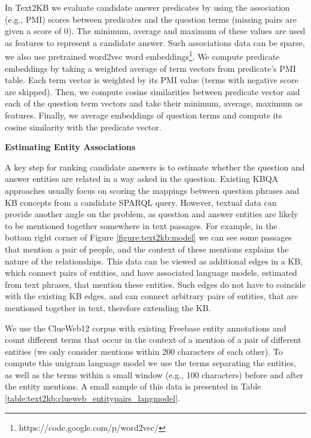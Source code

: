 In Text2KB we evaluate candidate answer predicates by using the association (e.g., PMI) scores between predicates and the question terms (missing pairs are given a score of 0).
The minimum, average and maximum of these values are used as features to represent a candidate answer.
Such associations data can be sparse, we also use pretrained word2vec word embeddings\footnote{https://code.google.com/p/word2vec/}.
We compute predicate embeddings by taking a weighted average of term vectors from predicate's PMI table.
Each term vector is weighted by its PMI value (terms with negative score are skipped).
Then, we compute cosine similarities between predicate vector and each of the question term vectors and take their minimum, average, maximum as features.
Finally, we average embeddings of question terms and compute its cosine similarity with the predicate vector.

\textbf{Estimating Entity Associations}

A key step for ranking candidate answers is to estimate whether the question and answer entities are related in a way asked in the question.
Existing KBQA approaches usually focus on scoring the mappings between question phrases and KB concepts from a candidate SPARQL query.
However, textual data can provide another angle on the problem, as question and answer entities are likely to be mentioned together somewhere in text passages.
For example, in the bottom right corner of Figure \ref{figure:text2kb:model} we can see some passages that mention a pair of people, and the context of these mentions explains the nature of the relationships.
This data can be viewed as additional edges in a KB, which connect pairs of entities, and have associated language models, estimated from text phrases, that mention these entities.
Such edges do not have to coincide with the existing KB edges, and can connect arbitrary pairs of entities, that are mentioned together in text, therefore extending the KB.

We use the ClueWeb12 corpus with existing Freebase entity annotations and count different terms that occur in the context of a mention of a pair of different entities (we only consider mentions within 200 characters of each other).
To compute this unigram language model we use the terms separating the entities, as well as the terms within a small window (e.g., 100 characters) before and after the entity mentions.
A small sample of this data is presented in Table \ref{table:text2kb:clueweb_entitypairs_langmodel}.

